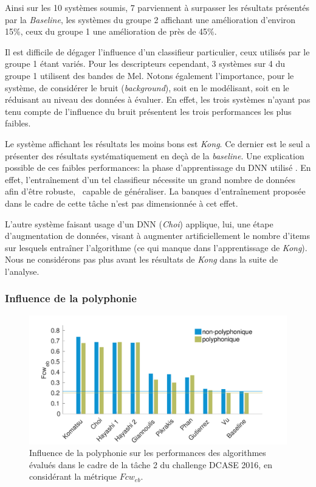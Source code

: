 Ainsi sur les 10 systèmes soumis, 7 parviennent à surpasser les résultats présentés par la \emph{Baseline}, les systèmes du groupe 2 affichant une amélioration d'environ 15\%, ceux du groupe 1 une amélioration de près de 45\%.

Il est difficile de dégager l'influence d'un classifieur particulier, ceux utilisés par le groupe 1 étant variés. Pour les descripteurs cependant, 3 systèmes sur 4 du groupe 1 utilisent des bandes de Mel. Notons également l'importance, pour le système, de considérer le bruit (\emph{background}), soit en le modélisant, soit en le réduisant au niveau des données à évaluer. En effet, les trois systèmes n'ayant pas tenu compte de l'influence du bruit présentent les trois performances les plus faibles.

Le système affichant les résultats les moins bons est \emph{Kong}. Ce dernier est le seul a présenter des résultats systématiquement en deçà de la \emph{baseline}. Une explication possible de ces faibles performances: la phase d'apprentissage du DNN utilisé \citep{Kong2016}. En effet, l’entraînement d'un tel classifieur nécessite un grand nombre de données afin d'être robuste, \ie~capable de généraliser. La banques d'entraînement proposée dans le cadre de cette tâche n'est pas dimensionnée à cet effet. 

L'autre système faisant usage d'un DNN (\emph{Choi}) applique, lui, une étape d'augmentation de données, visant à augmenter artificiellement le nombre d'items sur lesquels entraîner l'algorithme \citep{Choi2016} (ce qui manque dans l'apprentissage de \emph{Kong}). Nous ne considérons pas plus avant les résultats de \emph{Kong} dans la suite de l'analyse.

\subsubsection{Influence de la polyphonie}

\begin{figure}[t]
\includegraphics[width=1\textwidth]{gfx/ch_7/results_overall_poly_eb_class_wise_average_F_7}
\caption{Influence de la polyphonie sur les performances des algorithmes évalués dans le cadre de la tâche 2 du challenge DCASE 2016, en considérant la métrique $Fcw_{eb}$.}
\label{fig:overall_poly_eb_class_wise_F}
\end{figure}

